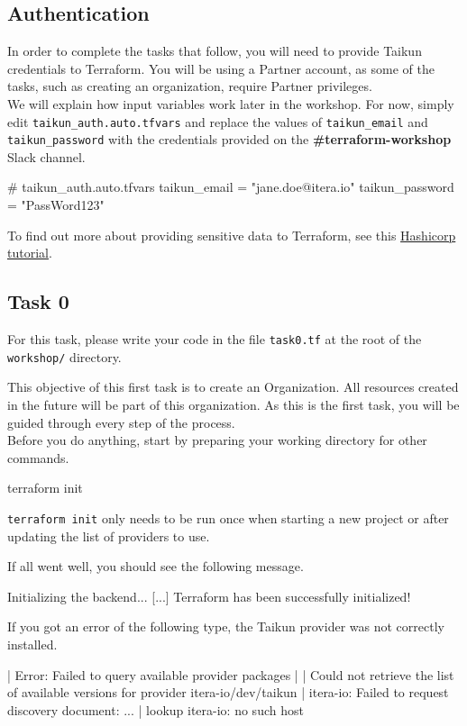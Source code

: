 \subsection{Authentication}
In order to complete the tasks that follow, you will need to provide Taikun credentials to Terraform.
You will be using a Partner account, as some of the tasks, such as creating an organization,
require Partner privileges.\\

We will explain how input variables work later in the workshop.
For now, simply edit \texttt{taikun\_auth.auto.tfvars}
and replace the values of \texttt{taikun\_email} and \texttt{taikun\_password}
with the credentials provided on the \textbf{\#terraform-workshop} Slack channel.
\begin{tf}
# taikun_auth.auto.tfvars
taikun_email = "jane.doe@itera.io"
taikun_password = "PassWord123"
\end{tf}
To find out more about providing sensitive data to Terraform, see this \href{https://learn.hashicorp.com/tutorials/terraform/sensitive-variables}{Hashicorp tutorial}.

\subsection{Task 0}\label{sec:task0}

\begin{note}
For this task, please write your code in the file \texttt{task0.tf}
at the root of the \texttt{workshop/} directory.
\end{note}

This objective of this first task is to create an Organization.
All resources created in the future will be part of this organization.
As this is the first task, you will be guided through every step of the process.\\

Before you do anything, start by preparing your working directory for other commands.
\begin{shell}
terraform init
\end{shell}
\begin{info}
\texttt{terraform init} only needs to be run once when starting a new project or after updating
the list of providers to use.
\end{info}
If all went well, you should see the following message.
\begin{raw}
Initializing the backend...
[...]
Terraform has been successfully initialized!
\end{raw}
If you got an error of the following type, the Taikun provider was not correctly installed.
\begin{raw}
| Error: Failed to query available provider packages
|
| Could not retrieve the list of available versions for provider itera-io/dev/taikun
| itera-io: Failed to request discovery document: ...
| lookup itera-io: no such host
\end{raw}

